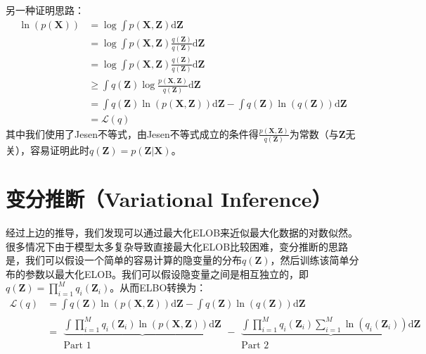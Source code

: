 另一种证明思路：
\begin{displaymath}
\begin{split}
\ln(p(\mathbf{X})) &= \log \int {p(\mathbf{X}, \mathbf{Z})} \mathrm{d}\mathbf{Z}\\
&= \log \int {p(\mathbf{X}, \mathbf{Z}) \frac{q(\mathbf{Z})}{q(\mathbf{Z})}} \mathrm{d}\mathbf{Z}\\
&= \log \int {p(\mathbf{X}, \mathbf{Z}) \frac{q(\mathbf{Z})}{q(\mathbf{Z})}} \mathrm{d}\mathbf{Z}\\
&\geq \int { q(\mathbf{Z}) \log{\frac{p(\mathbf{X}, \mathbf{Z})}{q(\mathbf{Z})}} } \mathrm{d}\mathbf{Z}\\
&= \int{ q(\mathbf{Z}) \ln( p(\mathbf{X}, \mathbf{Z}))} \mathrm{d}\mathbf{Z} -  \int{ q(\mathbf{Z}) \ln({q(\mathbf{Z})})} \mathrm{d}\mathbf{Z}\\
&= \mathcal{L}(q)
\end{split}
\end{displaymath}
其中我们使用了Jesen不等式，由Jesen不等式成立的条件得$\frac{p(\mathbf{X}, \mathbf{Z})}{q(\mathbf{Z})}$为常数（与$\mathbf{Z}$无关），容易证明此时$q(\mathbf{Z}) = p(\mathbf{Z}|\mathbf{X})$。

\section{变分推断（Variational Inference）}
经过上边的推导，我们发现可以通过最大化ELOB来近似最大化数据的对数似然。很多情况下由于模型太多复杂导致直接最大化ELOB比较困难，变分推断的思路是，我们可以假设一个简单的容易计算的隐变量的分布$q(\mathbf{Z})$，然后训练该简单分布的参数以最大化ELOB。我们可以假设隐变量之间是相互独立的，即$q(\mathbf{Z})=\prod_{i=1}^{M}{q_i(\mathbf{Z}_i)}$。从而ELBO转换为：
\begin{displaymath}
\begin{split}
\mathcal{L}(q) &= \int{ q(\mathbf{Z}) \ln( p(\mathbf{X}, \mathbf{Z}))} \mathrm{d}\mathbf{Z} -  \int{ q(\mathbf{Z}) \ln({q(\mathbf{Z})})} \mathrm{d}\mathbf{Z}\\
&=
\begin{matrix} 
\underbrace { 
 \int{ \prod_{i=1}^{M}{q_i(\mathbf{Z}_i)} \ln( p(\mathbf{X}, \mathbf{Z}))} \mathrm{d}\mathbf{Z}
}\\
\text{Part 1}
\end{matrix}
 - 
\begin{matrix} 
\underbrace { 
\int{ \prod_{i=1}^{M}{q_i(\mathbf{Z}_i)} \sum_{i=1}^{M} \ln({q_i(\mathbf{Z}_i)})} \mathrm{d}\mathbf{Z}
}\\
\text{Part 2}
\end{matrix}
\end{split}
\end{displaymath}


